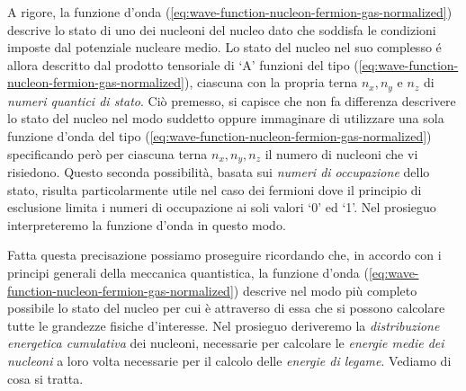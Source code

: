 A rigore, la funzione d’onda (\ref{eq:wave-function-nucleon-fermion-gas-normalized}) descrive lo stato di uno dei nucleoni del nucleo dato che soddisfa le condizioni imposte dal potenziale nucleare medio. Lo stato del nucleo nel suo complesso é allora descritto dal prodotto tensoriale di ‘A’ funzioni del tipo (\ref{eq:wave-function-nucleon-fermion-gas-normalized}), ciascuna con la propria terna $n_{x}, n_{y}$ e $n_{z}$ di \emph{numeri quantici di stato}. Ciò premesso, si capisce che non fa differenza descrivere lo stato del nucleo nel modo suddetto oppure immaginare di utilizzare una sola funzione d’onda del tipo (\ref{eq:wave-function-nucleon-fermion-gas-normalized}) specificando però per ciascuna terna $n_{x},n_{y},n_{z}$ il numero di nucleoni che vi risiedono. Questo seconda possibilità, basata sui \emph{numeri di occupazione} dello stato, risulta particolarmente utile nel caso dei fermioni dove il principio di esclusione limita i numeri di occupazione ai soli valori ‘0’ ed ‘1’. Nel prosieguo interpreteremo la funzione d’onda in questo modo.

Fatta questa precisazione possiamo proseguire ricordando che, in accordo con i principi generali della meccanica quantistica, la funzione d’onda (\ref{eq:wave-function-nucleon-fermion-gas-normalized}) descrive nel modo più completo possibile lo stato del nucleo per cui è attraverso di essa che si possono calcolare tutte le grandezze fisiche d’interesse. Nel prosieguo deriveremo la \emph{distribuzione energetica cumulativa} dei nucleoni, necessarie per calcolare le \emph{energie medie dei nucleoni} a loro volta necessarie per il calcolo delle \emph{energie di legame}. Vediamo di cosa si tratta.

